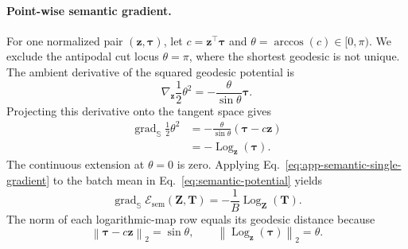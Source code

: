 \paragraph{Point-wise semantic gradient.}
For one normalized pair $(\mathbf{z},\boldsymbol{\tau})$, let
$c=\mathbf{z}^\top\boldsymbol{\tau}$ and
$\theta=\arccos(c)\in[0,\pi)$. We exclude the antipodal cut locus
$\theta=\pi$, where the shortest geodesic is not unique. The ambient
derivative of the squared geodesic potential is
\begin{equation}
    \nabla_{\mathbf{z}}
    \frac{1}{2}\theta^2
    =
    -\frac{\theta}{\sin\theta}
    \boldsymbol{\tau}.
\end{equation}
Projecting this derivative onto the tangent space gives
\begin{align}
    \operatorname{grad}_{\mathbb{S}}
    \frac{1}{2}\theta^2
    &=
    -\frac{\theta}{\sin\theta}
    \left(
        \boldsymbol{\tau}
        -
        c\mathbf{z}
    \right)
    \nonumber\\
    &=
    -\operatorname{Log}_{\mathbf{z}}(\boldsymbol{\tau}).
    \label{eq:app-semantic-single-gradient}
\end{align}
The continuous extension at $\theta=0$ is zero. Applying
Eq.~\ref{eq:app-semantic-single-gradient} to the batch mean in
Eq.~\ref{eq:semantic-potential} yields
\begin{equation}
    \operatorname{grad}_{\mathbb{S}}
    \mathcal{E}_{\mathrm{sem}}(\mathbf{Z},\mathbf{T})
    =
    -\frac{1}{B}
    \operatorname{Log}_{\mathbf{Z}}(\mathbf{T}).
    \label{eq:app-semantic-batch-gradient}
\end{equation}
The norm of each logarithmic-map row equals its geodesic distance because
\begin{equation}
    \left\lVert
        \boldsymbol{\tau}
        -
        c\mathbf{z}
    \right\rVert_2
    =
    \sin\theta,
    \qquad
    \left\lVert
        \operatorname{Log}_{\mathbf{z}}(\boldsymbol{\tau})
    \right\rVert_2
    =
    \theta.
    \label{eq:app-log-map-norm}
\end{equation}

